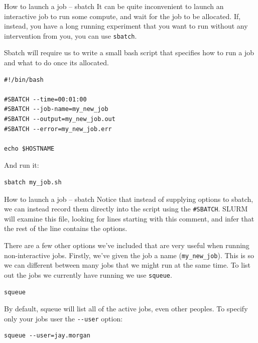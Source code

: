 \documentclass[10pt]{beamer}
\begin{document}
\begin{frame}[label={sec:org520c74d},fragile]{How to launch a job -- sbatch}
 It can be quite inconvenient to launch an interactive job to run some compute,
and wait for the job to be allocated. If, instead, you have a long running
experiment that you want to run without any intervention from you, you can use
\texttt{sbatch}.

Sbatch will require us to write a small bash script that specifies how to run a
job and what to do once its allocated.

\begin{verbatim}
#!/bin/bash

#SBATCH --time=00:01:00
#SBATCH --job-name=my_new_job
#SBATCH --output=my_new_job.out
#SBATCH --error=my_new_job.err

echo $HOSTNAME
\end{verbatim}

And run it:

\begin{verbatim}
sbatch my_job.sh
\end{verbatim}
\end{frame}

\begin{frame}[label={sec:org5229dd2},fragile]{How to launch a job -- sbatch}
 Notice that instead of supplying options to sbatch, we can instead record them
directly into the script using the \texttt{\#SBATCH}. SLURM will examine this file,
looking for lines starting with this comment, and infer that the rest of the
line contains the options.

There are a few other options we've included that are very useful when running
non-interactive jobs. Firstly, we've given the job a name (\texttt{my\_new\_job}). This is
so we can different between many jobs that we might run at the same time. To
list out the jobs we currently have running we use \texttt{squeue}.

\begin{verbatim}
squeue
\end{verbatim}

By default, squeue will list all of the active jobs, even other peoples. To
specify only your jobs user the \texttt{-{}-user} option:

\begin{verbatim}
squeue --user=jay.morgan
\end{verbatim}
\end{frame}
\end{document}

